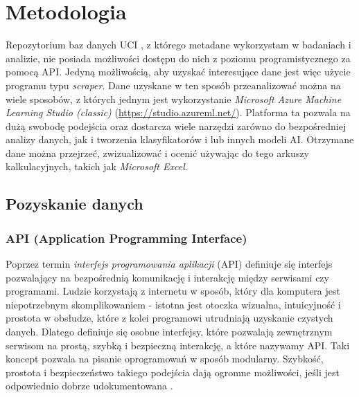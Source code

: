 \chapter{Metodologia}

Repozytorium baz danych UCI \cite{Dua:2021}, z którego metadane wykorzystam w badaniach i analizie, nie posiada możliwości dostępu do nich z poziomu programistycznego za pomocą API.
Jedyną możliwością, aby uzyskać interesujące dane jest więc użycie programu typu \emph{scraper}.
Dane uzyskane w ten sposób przeanalizować można na wiele sposobów, z których jednym jest wykorzystanie \emph{Microsoft Azure Machine Learning Studio (classic)} (\url{https://studio.azureml.net/}).
Platforma ta pozwala na dużą swobodę podejścia oraz dostarcza wiele narzędzi zarówno do bezpośredniej analizy danych, jak i tworzenia klasyfikatorów i lub innych modeli AI.
Otrzymane dane można przejrzeć, zwizualizować i ocenić używając do tego arkuszy kalkulacyjnych, takich jak \emph{Microsoft Excel}.

\section{Pozyskanie danych}

\subsection{API (Application Programming Interface)}

Poprzez termin \emph{interfejs programowania aplikacji} (API) definiuje się interfejs pozwalający na bezpośrednią komunikację i interakcję między serwisami czy programami.
Ludzie korzystają z internetu w sposób, który dla komputera jest niepotrzebnym skomplikowaniem - istotna jest otoczka wizualna, intuicyjność i prostota w obsłudze, które z kolei programowi utrudniają uzyskanie czystych danych.
Dlatego definiuje się osobne interfejsy, które pozwalają zewnętrznym serwisom na prostą, szybką i bezpieczną interakcję, a które nazywamy API.
Taki koncept pozwala na pisanie oprogramowań w sposób modularny.
Szybkość, prostota i bezpieczeństwo takiego podejścia dają ogromne możliwości, jeśli jest odpowiednio dobrze udokumentowana \cite{meng2018application}.

